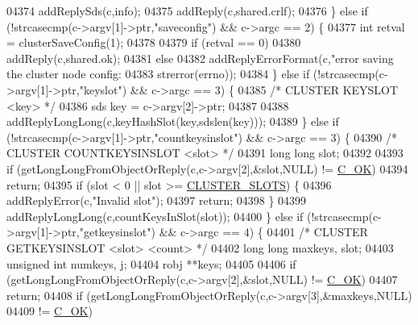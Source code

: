 \begin{DoxyCode}
{{{{{{{{{{{{{{{{{{{{{{{{{{{{{{{{{{{{{{{{{{{{{{{{{{{{{{{{{{{{{{{{{{{{{{{{{{{{{{{{{{{{{{{{{{{{{{{{{{{04374         addReplySds(c,info);
04375         addReply(c,shared.crlf);
04376     \} \textcolor{keywordflow}{else} \textcolor{keywordflow}{if} (!strcasecmp(c->argv[1]->ptr,\textcolor{stringliteral}{"saveconfig"}) && c->argc == 2) \{
04377         \textcolor{keywordtype}{int} retval = clusterSaveConfig(1);
04378 
04379         \textcolor{keywordflow}{if} (retval == 0)
04380             addReply(c,shared.ok);
04381         \textcolor{keywordflow}{else}
04382             addReplyErrorFormat(c,\textcolor{stringliteral}{"error saving the cluster node config: %
04383                 strerror(errno));
04384     \} \textcolor{keywordflow}{else} \textcolor{keywordflow}{if} (!strcasecmp(c->argv[1]->ptr,\textcolor{stringliteral}{"keyslot"}) && c->argc == 3) \{
04385         \textcolor{comment}{/* CLUSTER KEYSLOT <key> */}
04386         sds key = c->argv[2]->ptr;
04387 
04388         addReplyLongLong(c,keyHashSlot(key,sdslen(key)));
04389     \} \textcolor{keywordflow}{else} \textcolor{keywordflow}{if} (!strcasecmp(c->argv[1]->ptr,\textcolor{stringliteral}{"countkeysinslot"}) && c->argc == 3) \{
04390         \textcolor{comment}{/* CLUSTER COUNTKEYSINSLOT <slot> */}
04391         \textcolor{keywordtype}{long} \textcolor{keywordtype}{long} slot;
04392 
04393         \textcolor{keywordflow}{if} (getLongLongFromObjectOrReply(c,c->argv[2],&slot,NULL) != \hyperlink{server_8h_a303769ef1065076e68731584e758d3e1}{C\_OK})
04394             \textcolor{keywordflow}{return};
04395         \textcolor{keywordflow}{if} (slot < 0 || slot >= \hyperlink{cluster_8h_aa3e2cb951eebb16725ecc3f5beefd9fd}{CLUSTER\_SLOTS}) \{
04396             addReplyError(c,\textcolor{stringliteral}{"Invalid slot"});
04397             \textcolor{keywordflow}{return};
04398         \}
04399         addReplyLongLong(c,countKeysInSlot(slot));
04400     \} \textcolor{keywordflow}{else} \textcolor{keywordflow}{if} (!strcasecmp(c->argv[1]->ptr,\textcolor{stringliteral}{"getkeysinslot"}) && c->argc == 4) \{
04401         \textcolor{comment}{/* CLUSTER GETKEYSINSLOT <slot> <count> */}
04402         \textcolor{keywordtype}{long} \textcolor{keywordtype}{long} maxkeys, slot;
04403         \textcolor{keywordtype}{unsigned} \textcolor{keywordtype}{int} numkeys, j;
04404         robj **keys;
04405 
04406         \textcolor{keywordflow}{if} (getLongLongFromObjectOrReply(c,c->argv[2],&slot,NULL) != \hyperlink{server_8h_a303769ef1065076e68731584e758d3e1}{C\_OK})
04407             \textcolor{keywordflow}{return};
04408         \textcolor{keywordflow}{if} (getLongLongFromObjectOrReply(c,c->argv[3],&maxkeys,NULL)
04409             != \hyperlink{server_8h_a303769ef1065076e68731584e758d3e1}{C\_OK})
}}}}}}}}}}}}}}}}}}}}}}}}}}}}}}}}}}}}}}}}}}}}}}}}}}}}}}}}}}}}}}}}}}}}}}}}}}}}}}}}}}}}}}}}}}}}}}}}}}}}
\end{DoxyCode}
